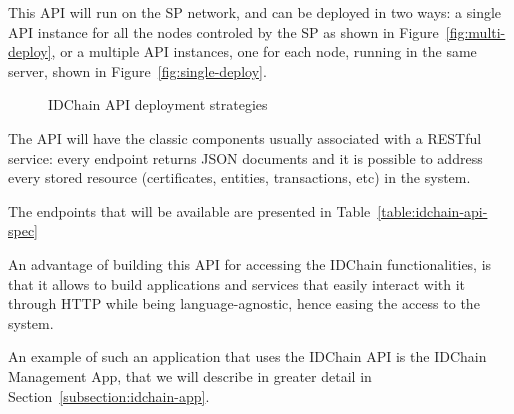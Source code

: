 This \ac{API} will run on the \ac{SP} network, and can be deployed in two ways: a single API instance for all the nodes controled by the \ac{SP} as shown in Figure~\ref{fig:multi-deploy}, or a multiple API instances, one for each node, running in the same server, shown in Figure~\ref{fig:single-deploy}.

\begin{figure}[htb]
  \centering
  \caption{IDChain API deployment strategies}
\end{figure}

The \ac{API} will have the classic components usually associated with a RESTful service: every endpoint returns JSON documents and it is possible to address every stored resource (certificates, entities, transactions, etc) in the system.

The endpoints that will be available are presented in Table~\ref{table:idchain-api-spec}

An advantage of building this \ac{API} for accessing the IDChain functionalities, is that it allows to build applications and services that easily interact with it through \ac{HTTP} while being language-agnostic, hence easing the access to the system.

An example of such an application that uses the IDChain API is the IDChain Management App, that we will describe in greater detail in Section~\ref{subsection:idchain-app}.

